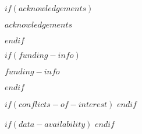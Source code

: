 
$if(acknowledgements)$
\begin{acknowledgements}
$acknowledgements$
\end{acknowledgements}
$endif$

$if(funding-info)$
\begin{funding}
$funding-info$
\end{funding}
$endif$

$if(conflicts-of-interest)$
$endif$

$if(data-availability)$
$endif$